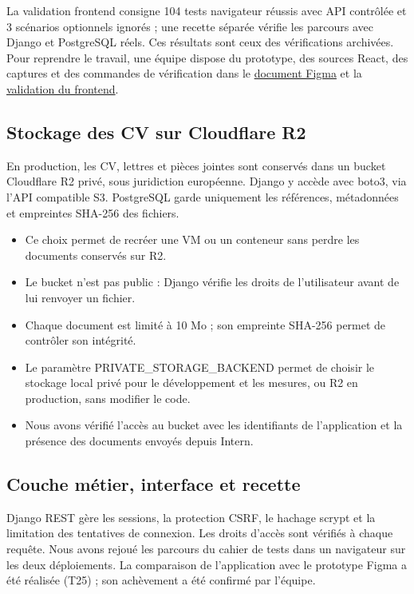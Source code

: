 \documentclass[a4paper,11pt]{article}
\begin{document}
La validation frontend consigne 104 tests navigateur réussis avec API contrôlée et 3 scénarios optionnels ignorés ; une recette séparée vérifie les parcours avec Django et PostgreSQL réels. Ces résultats sont ceux des vérifications archivées. Pour reprendre le travail, une équipe dispose du prototype, des sources React, des captures et des commandes de vérification dans le \href{https://github.com/OmarBenje/Intern/blob/master/docs/Figma.md}{document Figma} et la \href{https://github.com/OmarBenje/Intern/blob/master/frontend/VALIDATION.md}{validation du frontend}.

\subsection{Stockage des CV sur Cloudflare R2}
En production, les CV, lettres et pièces jointes sont conservés dans un bucket Cloudflare R2 privé, sous juridiction européenne. Django y accède avec boto3, via l'API compatible S3. PostgreSQL garde uniquement les références, métadonnées et empreintes SHA-256 des fichiers.

\begin{itemize}
\item Ce choix permet de recréer une VM ou un conteneur sans perdre les documents conservés sur R2.
\item Le bucket n'est pas public : Django vérifie les droits de l'utilisateur avant de lui renvoyer un fichier.
\item Chaque document est limité à 10 Mo ; son empreinte SHA-256 permet de contrôler son intégrité.
\item Le paramètre PRIVATE\_STORAGE\_BACKEND permet de choisir le stockage local privé pour le développement et les mesures, ou R2 en production, sans modifier le code.
\item Nous avons vérifié l'accès au bucket avec les identifiants de l'application et la présence des documents envoyés depuis Intern.
\end{itemize}
\subsection{Couche métier, interface et recette}
Django REST gère les sessions, la protection CSRF, le hachage scrypt et la limitation des tentatives de connexion. Les droits d'accès sont vérifiés à chaque requête. Nous avons rejoué les parcours du cahier de tests dans un navigateur sur les deux déploiements. La comparaison de l'application avec le prototype Figma a été réalisée (T25) ; son achèvement a été confirmé par l'équipe.
\end{document}
